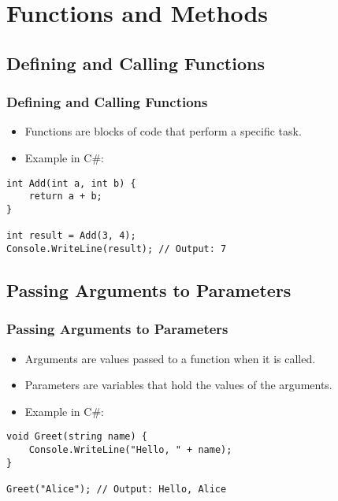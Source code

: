 \section{Functions and Methods}

\subsection{Defining and Calling Functions}
\begin{frame}[fragile]
\frametitle{Defining and Calling Functions}
\begin{itemize}
    \item Functions are blocks of code that perform a specific task.
    \item Example in C\#:
\end{itemize}
\begin{verbatim}
int Add(int a, int b) {
    return a + b;
}

int result = Add(3, 4);
Console.WriteLine(result); // Output: 7
\end{verbatim}
\end{frame}

\subsection{Passing Arguments to Parameters}
\begin{frame}[fragile]
\frametitle{Passing Arguments to Parameters}
\begin{itemize}
    \item Arguments are values passed to a function when it is called.
    \item Parameters are variables that hold the values of the arguments.
    \item Example in C\#:
\end{itemize}
\begin{verbatim}
void Greet(string name) {
    Console.WriteLine("Hello, " + name);
}

Greet("Alice"); // Output: Hello, Alice
\end{verbatim}
\end{frame}
